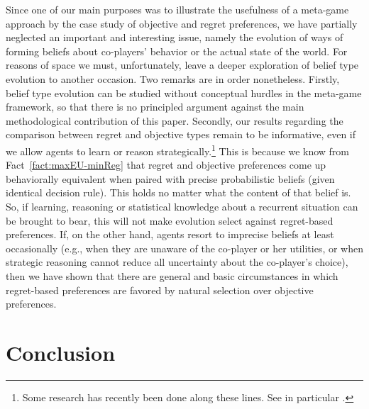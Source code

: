 \documentclass[fleqn,reqno,12pt]{article}
\theoremstyle{Satz}
\theoremstyle{Bsp}
\begin{document}
Since one of our main purposes was to illustrate the usefulness of a meta-game approach
by the case study of objective and regret preferences, we have partially neglected an 
important and interesting issue, namely the evolution of ways of forming beliefs
about co-players' behavior or the actual state of the world. For reasons of space we must,
unfortunately, leave a deeper exploration of belief type evolution to another occasion. Two
remarks are in order nonetheless. Firstly, belief type evolution can be studied without
conceptual hurdles in the meta-game framework, so that there is no principled argument
against the main methodological contribution of this paper. Secondly, our results regarding the
comparison between regret and objective types remain to be informative, even if we
allow agents to learn or reason strategically.\footnote{Some research has recently been done along these lines. See in particular \cite{RobalinoRobson16,Mengel12,Mohlin12}.} This is because we know from
Fact~\ref{fact:maxEU-minReg} that regret and objective preferences come up behaviorally
equivalent when paired with precise probabilistic beliefs (given identical decision rule). This
holds no matter what the content of that belief is. So, if learning, reasoning or statistical
knowledge about a recurrent situation can be brought to bear, this will not make evolution
select against regret-based preferences. If, on the other hand, agents resort to imprecise
beliefs at least occasionally (e.g., when they are unaware of the co-player or her utilities,
or when strategic reasoning cannot reduce all uncertainty about the co-player's choice), then we
have shown that there are general and basic circumstances in which regret-based preferences
are favored by natural selection over objective preferences.

\section{Conclusion} \label{sec:conclusion}
\end{document}
